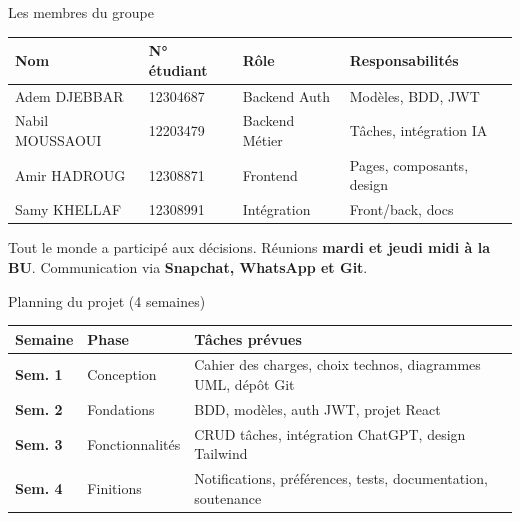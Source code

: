 \documentclass[aspectratio=169, 10pt]{beamer}
\begin{document}
\begin{frame}{Les membres du groupe}
\small
\begin{center}
\begin{tabular}{l l l l}
\toprule
\textbf{Nom} & \textbf{N° étudiant} & \textbf{Rôle} & \textbf{Responsabilités} \\
\midrule
Adem DJEBBAR & 12304687 & \textcolor{secondary}{Backend Auth} & Modèles, BDD, JWT \\
\rowcolor{light}
Nabil MOUSSAOUI & 12203479 & \textcolor{secondary}{Backend Métier} & Tâches, intégration IA \\
Amir HADROUG & 12308871 & \textcolor{secondary}{Frontend} & Pages, composants, design \\
\rowcolor{light}
Samy KHELLAF & 12308991 & \textcolor{secondary}{Intégration} & Front/back, docs \\
\bottomrule
\end{tabular}
\end{center}
\vspace{0.3cm}
Tout le monde a participé aux décisions. Réunions \textbf{mardi et jeudi midi à la BU}. Communication via \textbf{Snapchat, WhatsApp et Git}.
\end{frame}

\begin{frame}{Planning du projet (4 semaines)}
\footnotesize
\begin{center}
\begin{tabular}{l l p{8cm}}
\toprule
\textbf{Semaine} & \textbf{Phase} & \textbf{Tâches prévues} \\
\midrule
\textcolor{secondary}{\textbf{Sem. 1}} & Conception & Cahier des charges, choix technos, diagrammes UML, dépôt Git \\
\rowcolor{light}
\textcolor{accent}{\textbf{Sem. 2}} & Fondations & BDD, modèles, auth JWT, projet React \\
\textcolor{success}{\textbf{Sem. 3}} & Fonctionnalités & CRUD tâches, intégration ChatGPT, design Tailwind \\
\rowcolor{light}
\textcolor{warning}{\textbf{Sem. 4}} & Finitions & Notifications, préférences, tests, documentation, soutenance \\
\bottomrule
\end{tabular}
\end{center}
\end{frame}
\end{document}
